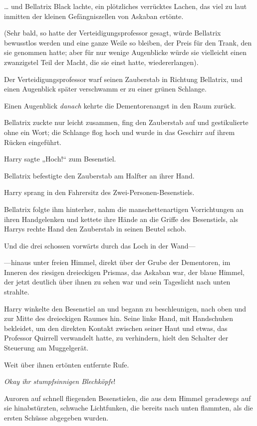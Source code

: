 {… und Bellatrix Black lachte, ein plötzliches verrücktes Lachen, das viel zu laut inmitten der kleinen Gefängniszellen von Askaban ertönte.

(Sehr bald, so hatte der Verteidigungsprofessor gesagt, würde Bellatrix bewusstlos werden und eine ganze Weile so bleiben, der Preis für den Trank, den sie genommen hatte; aber für nur wenige Augenblicke würde sie vielleicht einen zwanzigstel Teil der Macht, die sie einst hatte, wiedererlangen).

Der Verteidigungsprofessor warf seinen Zauberstab in Richtung Bellatrix, und einen Augenblick später verschwamm er zu einer grünen Schlange.

Einen Augenblick \emph{danach} kehrte die Dementorenangst in den Raum zurück.

Bellatrix zuckte nur leicht zusammen, fing den Zauberstab auf und gestikulierte ohne ein Wort; die Schlange flog hoch und wurde in das Geschirr auf ihrem Rücken eingeführt.

Harry sagte „Hoch!“ zum Besenstiel.

Bellatrix befestigte den Zauberstab am Halfter an ihrer Hand.

Harry sprang in den Fahrersitz des Zwei-Personen-Besenstiels.

Bellatrix folgte ihm hinterher, nahm die manschettenartigen Vorrichtungen an ihren Handgelenken und kettete ihre Hände an die Griffe des Besenstiels, als Harrys rechte Hand den Zauberstab in seinen Beutel schob.

Und die drei schossen vorwärts durch das Loch in der Wand—

—hinaus unter freien Himmel, direkt über der Grube der Dementoren, im Inneren des riesigen dreieckigen Prismas, das Askaban war, der blaue Himmel, der jetzt deutlich über ihnen zu sehen war und sein Tageslicht nach unten strahlte.

Harry winkelte den Besenstiel an und begann zu beschleunigen, nach oben und zur Mitte des dreieckigen Raumes hin. Seine linke Hand, mit Handschuhen bekleidet, um den direkten Kontakt zwischen seiner Haut und etwas, das Professor Quirrell verwandelt hatte, zu verhindern, hielt den Schalter der Steuerung am Muggelgerät.

Weit über ihnen ertönten entfernte Rufe.

\emph{Okay ihr stumpfsinnigen Blechköpfe}!

Auroren auf schnell fliegenden Besenstielen, die aus dem Himmel geradewegs auf sie hinabstürzten, schwache Lichtfunken, die bereits nach unten flammten, als die ersten Schüsse abgegeben wurden.

}
